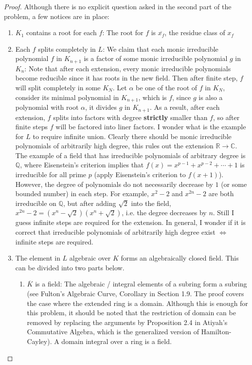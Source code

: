 \documentclass{solution}
\begin{document}
\begin{proof}
    Although there is no explicit question asked in the second part of the problem, a few notices are in place:
    \begin{enumerate}
        \item $K_1$ contains a root for each $f$: The root for $f$ is $\overline{x_f}$, the residue class of $x_f$
        \item Each $f$ splits completely in $L$: We claim that each monic irreducible polynomial $f$ in $K_{n + 1}$ is a factor of some monic irreducible polynomial $g$ in $K_n$: Note that after each extension, every monic irreducible polynomials become reducible since it has roots in the new field. Then after finite step, $f$ will split completely in some $K_{N}$. Let $\alpha$ be one of the root of $f$ in $K_{N}$, consider its minimal polynomial in $K_{n + 1}$, which is $f$, since $g$ is also a polynomial with root $\alpha$, it divides $g$ in $K_{n + 1}$. As a result, after each extension, $f$ splits into factors with degree \textbf{strictly} smaller than $f$, so after finite steps $f$ will be factored into liner factors. {\color{red} I wonder what is the example for $L$ to require infinite union. Clearly there should be monic irreducible polynomials of arbitrarily high degree, this rules out the extension $\mathbb{R} \rightarrow \mathbb{C}$. The example of a field that has irreducible polynomials of arbitrary degree is $\mathbb{Q}$, where Eisenstein's criterion implies that $f(x) = x^{p - 1} + x ^{p - 2} + \cdots + 1$ is irreducible for all prime $p$ (apply Eisenstein's criterion to $f(x + 1)$). However, the degree of polynomials do not necessarily decrease by $1$ (or some bounded number) in each step. For example, $x^2 - 2$ and $x^{2n} - 2$ are both irreducible on $\mathbb{Q}$, but after adding $\sqrt{2}$ into the field, $x^{2n} - 2 = (x^n - \sqrt{2})(x^n + \sqrt{2})$, i.e. the degree decreases by $n$. Still I guess infinite steps are required for the extension. In general, I wonder if it is correct that irreducible polynomials of arbitrarily high degree exist $\Leftrightarrow$ infinite steps are required.}
        \item The element in $L$ algebraic over $K$ forms an algebraically closed field. This can be divided into two parts below.
        \begin{enumerate}
            \item $\overline{K}$ is a field: The algebraic / integral elements of a subring form a subring (see Fulton's Algebraic Curve, Corollary in Section 1.9. The proof covers the case where the extended ring is a domain. Although this is enough for this problem, it should be noted that the restriction of domain can be removed by replacing the arguments by Proposition 2.4 in Atiyah's Commutative Algebra, which is the generalized version of Hamilton-Cayley). A domain integral over a ring is a field.

\end{enumerate}
\end{enumerate}
\end{proof}
\end{document}
